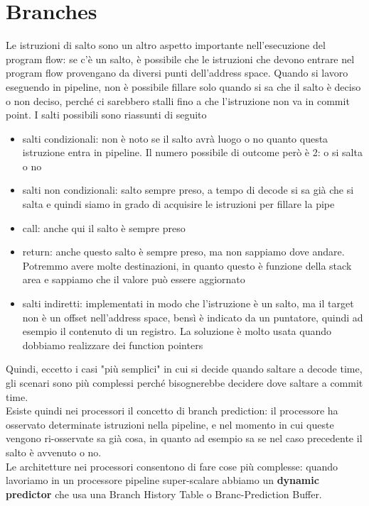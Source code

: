 \documentclass[14pt, oneside]{book}
\begin{document}
\section{Branches}
Le istruzioni di salto sono un altro aspetto importante nell'esecuzione del program flow: se c'è un salto, è possibile che le istruzioni che devono entrare nel program flow provengano da diversi punti dell'address space. Quando si lavoro eseguendo in pipeline, non è possibile fillare solo quando si sa che il salto è deciso o non deciso, perché ci sarebbero stalli fino a che l'istruzione non va in commit point. I salti possibili sono riassunti di seguito 
\begin{itemize}
\item salti condizionali: non è noto se il salto avrà luogo o no quanto questa istruzione entra in pipeline. Il numero possibile di outcome però è 2: o si salta o no
\item salti non condizionali: salto sempre preso, a tempo di decode si sa già che si salta e quindi siamo in grado di acquisire le istruzioni per fillare la pipe 
\item call: anche qui il salto è sempre preso
\item return: anche questo salto è sempre preso, ma non sappiamo dove andare. Potremmo avere molte destinazioni, in quanto questo è funzione della stack area e sappiamo che il valore può essere aggiornato
\item salti indiretti: implementati in modo che l'istruzione è un salto, ma il target non è un offset nell'address space, bensì è indicato da un puntatore, quindi ad esempio il contenuto di un registro. La soluzione è molto usata quando dobbiamo realizzare dei function pointers
\end{itemize}
Quindi, eccetto i casi "più semplici" in cui si decide quando saltare a decode time, gli scenari sono più complessi perché bisognerebbe decidere dove saltare a commit time.\\ Esiste quindi nei processori il concetto di branch prediction: il processore ha osservato determinate istruzioni nella pipeline, e nel momento in cui queste vengono ri-osservate sa già cosa, in quanto ad esempio sa se nel caso precedente il salto è avvenuto o no.\\ Le architetture nei processori consentono di fare cose più complesse: quando lavoriamo in un processore pipeline super-scalare abbiamo un \textbf{dynamic predictor} che usa una Branch History Table o Branc-Prediction Buffer.\\ 
\end{document}
